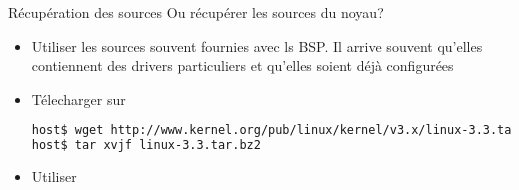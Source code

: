 \begin{frame}[fragile=singleslide]{Récupération des sources}
  Ou récupérer les sources du noyau?
  \begin{itemize} 
  \item Utiliser les sources souvent  fournies avec ls BSP.  Il arrive
    souvent qu'elles contiennent  des drivers particuliers et qu'elles
    soient déjà configurées
  \item Télecharger sur 
    \begin{lstlisting}[language=sh]
host$ wget http://www.kernel.org/pub/linux/kernel/v3.x/linux-3.3.tar.bz2
host$ tar xvjf linux-3.3.tar.bz2
    \end{lstlisting}
  \item Utiliser 
  \end{itemize} 
\end{frame} 

